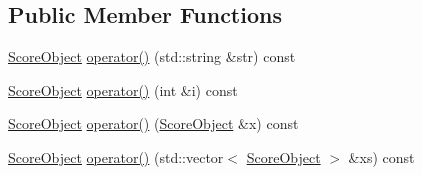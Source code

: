 \subsection*{Public Member Functions}
\begin{DoxyCompactItemize}
\item 
\hyperlink{class_score_object}{Score\-Object} \hyperlink{classget_score_object_arg_a5c4ba390f0c95cf116441ea85564db54}{operator()} (std\-::string \&str) const 
\item 
\hyperlink{class_score_object}{Score\-Object} \hyperlink{classget_score_object_arg_a7127a547ad675123a0fa97d88abaf281}{operator()} (int \&i) const 
\item 
\hyperlink{class_score_object}{Score\-Object} \hyperlink{classget_score_object_arg_a11b4ad521c5e491b633be6a794afd5ec}{operator()} (\hyperlink{class_score_object}{Score\-Object} \&x) const 
\item 
\hyperlink{class_score_object}{Score\-Object} \hyperlink{classget_score_object_arg_aafd959b6293d33a3b6813da9658f63f3}{operator()} (std\-::vector$<$ \hyperlink{class_score_object}{Score\-Object} $>$ \&xs) const 
\end{DoxyCompactItemize}


